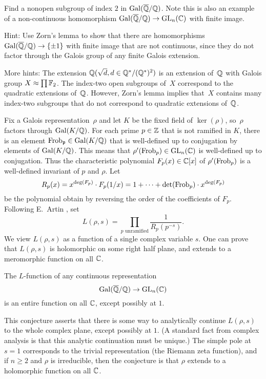 {\begin{exercise}\label{ex:nonopensbgpfiniteindexgalq}
	Find a nonopen subgroup of index $2$ in $\operatorname{Gal}(\overline{\mathbb{Q}}/\mathbb{Q})$.
	Note this is also an example of a non-continuous
	homomorphism $\operatorname{Gal}(\overline{\mathbb{Q}}/\mathbb{Q})\to\operatorname{GL}_n(\mathbb{C})$ with finite image.
	
	
	Hint: Use Zorn's lemma to show that there are homomorphisms
	$\operatorname{Gal}(\overline{\mathbb{Q}}/\mathbb{Q})\to\{\pm 1\}$ with finite image that are not continuous,
	since they do not factor through the Galois group of any finite
	Galois extension.
	
	More hints: The extension $\mathbb{Q}(\sqrt{d}, d \in \mathbb{Q}^*/(\mathbb{Q}^*)^2)$
	is an extension of~$\mathbb{Q}$ with Galois group $X\approx \prod \mathbb{F}_2$.
	The index-two open subgroups of~$X$ correspond to the quadratic
	extensions of~$\mathbb{Q}$. However, Zorn's lemma implies that~$X$
	contains many index-two subgroups that do not correspond to
	quadratic extensions of~$\mathbb{Q}$.
\end{exercise}

Fix a Galois representation~$\rho$ and let $K$ be the fixed field of
$\ker(\rho)$, so~$\rho$ factors through $\operatorname{Gal}(K/\mathbb{Q})$.  For each prime
$p\in\mathbb{Z}$ that is not ramified in $K$, there is an element
$\operatorname{Frob}_{\mathfrak{p}}\in\operatorname{Gal}(K/\mathbb{Q})$ that is well-defined up to conjugation by
elements of $\operatorname{Gal}(K/\mathbb{Q})$.  This means that $\rho'(\operatorname{Frob}_p)\in
\operatorname{GL}_n(\mathbb{C})$ is well-defined up to conjugation.  Thus the characteristic
polynomial $F_p(x)\in\mathbb{C}[x]$ of $\rho'(\operatorname{Frob}_p)$ is a well-defined
invariant of $p$ and $\rho$.  Let
$$R_p(x) = x^{\deg(F_p)}\cdot F_p(1/x) = 1 + \cdots +
\det(\operatorname{Frob}_p)\cdot x^{\deg(F_p)}$$
be the polynomial obtain
by reversing the order of the coefficients of $F_p$.
Following E.~Artin \cite{artin:conjecture, artin:conjecture2}, set
\begin{equation}\label{eqn:artin}
L(\rho,s) = \prod_{p\text{ unramified}}
\frac{1}{R_p(p^{-s})}.
\end{equation}
We view $L(\rho,s)$ as a function of a single complex variable $s$.
One can prove that $L(\rho,s)$ is holomorphic on some right
half plane, and extends to a meromorphic function on all $\mathbb{C}$.
\begin{conjecture}[Artin]\label{conj:artin}
The $L$-function of any continuous representation $$\operatorname{Gal}(\overline{\mathbb{Q}}/\mathbb{Q})\to\operatorname{GL}_n(\mathbb{C})$$
is an entire function on all $\mathbb{C}$, except possibly at $1$.
\end{conjecture}
This conjecture asserts that there is some way to analytically continue
$L(\rho,s)$ to the whole complex plane, except possibly at $1$.
(A standard fact from complex analysis is that this analytic
continuation must be unique.)
The simple pole at $s=1$ corresponds to the trivial representation (the
Riemann zeta function), and if $n\geq 2$ and $\rho$ is irreducible,
then the conjecture is that $\rho$ extends to a holomorphic function
on all $\mathbb{C}$.

}
